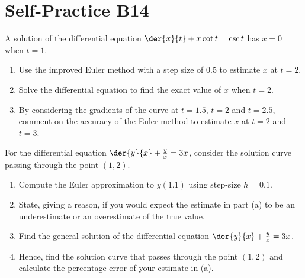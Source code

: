 \section{Self-Practice B14}

\begin{problem}
    A solution of the differential equation $\der{x}{t} + x \cot t = \csc t$ has $x = 0$ when $t = 1$.
    \begin{enumerate}
        \item Use the improved Euler method with a step size of $0.5$ to estimate $x$ at $t = 2$.
        \item Solve the differential equation to find the exact value of $x$ when $t = 2$.
        \item By considering the gradients of the curve at $t = 1.5$, $t = 2$ and $t = 2.5$, comment
        on the accuracy of the Euler method to estimate $x$ at $t = 2$ and $t = 3$.
    \end{enumerate}
\end{problem}

\begin{problem}
    For the differential equation $\der{y}{x} + \frac{y}{x} = 3x$, consider the solution curve passing through the point $(1, 2)$.
    \begin{enumerate}
        \item Compute the Euler approximation to $y(1.1)$ using step-size $h = 0.1$.
        \item State, giving a reason, if you would expect the estimate in part (a) to be an underestimate or an overestimate of the true value.
        \item Find the general solution of the differential equation $\der{y}{x} + \frac{y}{x} = 3x$.
        \item Hence, find the solution curve that passes through the point $(1, 2)$ and calculate
        the percentage error of your estimate in (a).
    \end{enumerate}
\end{problem}

